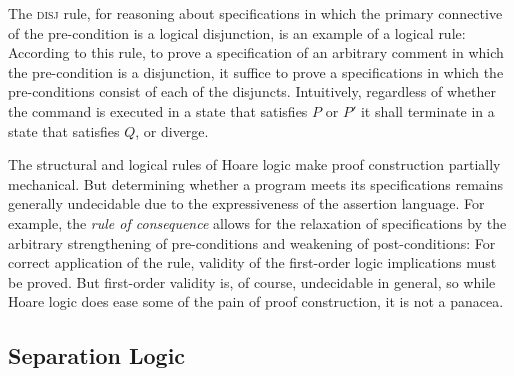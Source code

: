 \documentclass[11pt]{report}         %
\begin{document}
The \textsc{disj} rule, for reasoning about specifications in which the primary connective of the pre-condition is a logical disjunction, is an example of a logical rule:  According to this rule, to prove a specification of an arbitrary comment in which the pre-condition is a disjunction, it suffice to prove a specifications in which the pre-conditions consist of each of the disjuncts. Intuitively, regardless of whether the command is executed in a state that satisfies $P$ or $P'$ it shall terminate in a state that satisfies $Q$, or diverge. 

The structural and logical rules of Hoare logic make proof construction partially mechanical. But determining whether a program meets its specifications remains generally undecidable due to the expressiveness of the assertion language. For example, the \emph{rule of consequence} allows for the relaxation of specifications by the arbitrary strengthening of pre-conditions and weakening of post-conditions:  For correct application of the rule, validity of the first-order logic implications must be proved. But first-order validity is, of course, undecidable in general, so while Hoare logic does ease some of the pain of proof construction, it is not a panacea.


\subsection{Separation Logic}
\label{sec:separation-logic}
\end{document}

